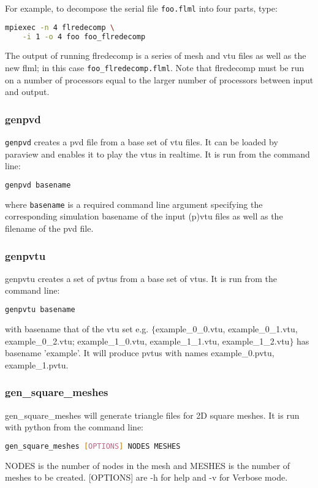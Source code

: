 For example, to decompose the serial file \lstinline+foo.flml+
into four parts, type:

\begin{lstlisting}[language=bash]
mpiexec -n 4 flredecomp \
    -i 1 -o 4 foo foo_flredecomp
\end{lstlisting}

The output of running flredecomp is a series of mesh and vtu files as well
as the new flml; in this case \lstinline+foo_flredecomp.flml+.
Note that flredecomp must be run on a number of processors equal to the larger number of processors between input and output.


\subsubsection{genpvd}
\label{sec:genpvd}
\texttt{genpvd} creates a pvd file from a base set of vtu files. It can be loaded by paraview and enables it to play the vtus in realtime. It is run from the command line:
\begin{lstlisting}[language = Bash]
genpvd basename
\end{lstlisting}
where \texttt{basename} is a required command line argument specifying the corresponding simulation basename of the input (p)vtu files as well as the filename of the pvd file.


\subsubsection{genpvtu}
\label{sec:genpvtu}
genpvtu creates a set of pvtus from a base set of vtus. It is run from the command line:
\begin{lstlisting}[language = Bash]
genpvtu basename 
\end{lstlisting}
with basename that of the vtu set e.g. $\{$example\_0\_0.vtu, example\_0\_1.vtu, example\_0\_2.vtu; example\_1\_0.vtu, example\_1\_1.vtu, example\_1\_2.vtu$\}$ has basename 'example'. It will produce pvtus with names example\_0.pvtu, example\_1.pvtu.


\subsubsection{gen\_square\_meshes}
\label{sec:gen_square_meshes}
gen\_square\_meshes will generate triangle files for 2D square meshes. It is run with python from the command line:
\begin{lstlisting}[language = Bash]
gen_square_meshes [OPTIONS] NODES MESHES 
\end{lstlisting} 
NODES is the number of nodes in the mesh and MESHES is the number of meshes to be created. [OPTIONS] are -h for help and -v for Verbose mode.

